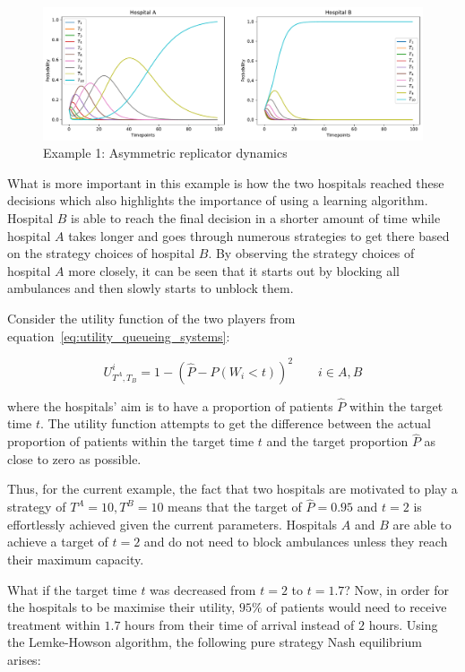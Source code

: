 \begin{figure}[H]
    \centering
    \includegraphics[width=\linewidth]{chapters/05_numerical_results/Bin/example_1/base_case.pdf}
    \caption{Example 1: Asymmetric replicator dynamics}
    \label{fig:asymmetric_replicator_dynamics_example_1}
\end{figure}

What is more important in this example is how the two hospitals reached these
decisions which also highlights the importance of using a learning algorithm.
Hospital \(B\) is able to reach the final decision in a shorter amount of time
while  hospital \(A\) takes longer and goes through numerous strategies to get
there based on the strategy choices of hospital \(B\).
By observing the strategy choices of hospital \(A\) more closely, it can be seen
that it starts out by blocking all ambulances and then slowly starts to unblock
them.

Consider the utility function of the two players from
equation~\eqref{eq:utility_queueing_systems}:

\begin{equation*}
    U_{T^A, T_B}^i = 1 - \left( \hat{P} - P(W_i < t) \right)^2
    \qquad i \in {A, B}
\end{equation*}

where the hospitals' aim is to have a proportion of patients \(\hat{P}\)
within the target time \(t\).
The utility function attempts to get the difference between the actual
proportion of patients within the target time \(t\) and the target proportion
\(\hat{P}\) as close to zero as possible.

Thus, for the current example, the fact that two hospitals are
motivated to play a strategy of \(T^A = 10, T^B = 10\) means that the target
of \(\hat{P} = 0.95\) and \(t = 2\) is effortlessly achieved given the current
parameters.
Hospitals \(A\) and \(B\) are able to achieve a target of \(t = 2\) and do not
need to block ambulances unless they reach their maximum capacity.

What if the target time \(t\) was decreased from \(t = 2\) to \(t = 1.7\)?
Now, in order for the hospitals to be maximise their utility, \(95\%\) of
patients would need to receive treatment within \(1.7\) hours from their time
of arrival instead of \(2\) hours.
Using the Lemke-Howson algorithm, the following pure strategy Nash equilibrium
arises:

